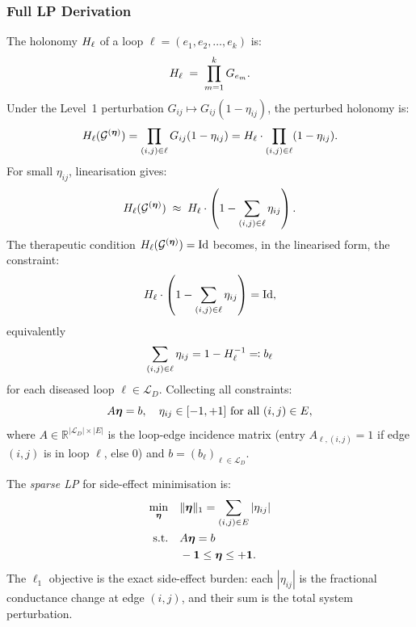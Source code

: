 \subsubsection{Full LP Derivation}

The holonomy $H_\ell$ of a loop $\ell = (e_1, e_2, \ldots, e_k)$ is:
\[
  H_\ell \;=\; \prod_{m=1}^k G_{e_m}.
\]
Under the Level~1 perturbation $G_{ij} \mapsto G_{ij}(1-\eta_{ij})$, the
perturbed holonomy is:
\[
  H_\ell(\mathcal{G}^{(\boldsymbol{\eta})})
  = \prod_{(i,j) \in \ell} G_{ij}(1-\eta_{ij})
  = H_\ell \cdot \prod_{(i,j) \in \ell} (1-\eta_{ij}).
\]
For small $\eta_{ij}$, linearisation gives:
\begin{equation}
  H_\ell(\mathcal{G}^{(\boldsymbol{\eta})})
  \;\approx\; H_\ell \cdot \left(1 - \sum_{(i,j) \in \ell} \eta_{ij}\right).
  \label{eq:ch10-holonomy-linearise}
\end{equation}
The therapeutic condition $H_\ell(\mathcal{G}^{(\boldsymbol{\eta})}) = \mathrm{Id}$ becomes,
in the linearised form, the constraint:
\[
  H_\ell \cdot \left(1 - \sum_{(i,j) \in \ell} \eta_{ij}\right) = \mathrm{Id},
\]
equivalently
\begin{equation}
  \sum_{(i,j) \in \ell} \eta_{ij}
  = 1 - H_\ell^{-1}
  \eqqcolon b_\ell
  \label{eq:holonomy-constraint}
\end{equation}
for each diseased loop $\ell \in \mathcal{L}_D$.  Collecting all constraints:
\begin{equation}
  A \boldsymbol{\eta} = b,
  \quad \eta_{ij} \in [-1, +1] \text{ for all } (i,j) \in E,
  \label{eq:lp-constraints}
\end{equation}
where $A \in \mathbb{R}^{|\mathcal{L}_D| \times |E|}$ is the loop-edge
incidence matrix (entry $A_{\ell, (i,j)} = 1$ if edge $(i,j)$ is in loop
$\ell$, else $0$) and $b = (b_\ell)_{\ell \in \mathcal{L}_D}$.

The \emph{sparse LP} for side-effect minimisation is:
\begin{equation}
\begin{aligned}
  \min_{\boldsymbol{\eta}} \quad & \|\boldsymbol{\eta}\|_1 = \sum_{(i,j) \in E} |\eta_{ij}| \\
  \text{s.t.} \quad
  & A\boldsymbol{\eta} = b \\
  & -\mathbf{1} \leq \boldsymbol{\eta} \leq +\mathbf{1}.
\end{aligned}
\label{eq:ch10-sparse-LP}
\end{equation}
The $\ell_1$ objective is the exact side-effect burden: each $|\eta_{ij}|$
is the fractional conductance change at edge $(i,j)$, and their sum
is the total system perturbation.

